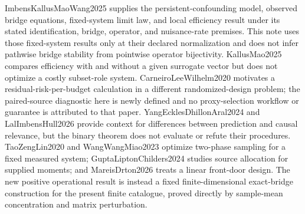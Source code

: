 ImbensKallusMaoWang2025 supplies the persistent-confounding model, observed bridge equations, fixed-system limit law, and local efficiency result under its stated identification, bridge, operator, and nuisance-rate premises.  This note uses those fixed-system results only at their declared normalization and does not infer pathwise bridge stability from pointwise operator bijectivity.  KallusMao2025 compares efficiency with and without a given surrogate vector but does not optimize a costly subset-role system.  CarneiroLeeWilhelm2020 motivates a residual-risk-per-budget calculation in a different randomized-design problem; the paired-source diagnostic here is newly defined and no proxy-selection workflow or guarantee is attributed to that paper.  YangEcklesDhillonAral2024 and LalImbensHull2026 provide context for differences between prediction and causal relevance, but the binary theorem does not evaluate or refute their procedures.  TaoZengLin2020 and WangWangMiao2023 optimize two-phase sampling for a fixed measured system; GuptaLiptonChilders2024 studies source allocation for supplied moments; and MareisDrton2026 treats a linear front-door design.  The new positive operational result is instead a fixed finite-dimensional exact-bridge construction for the present finite catalogue, proved directly by sample-mean concentration and matrix perturbation.